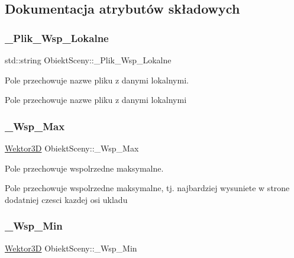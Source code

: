 \subsection{Dokumentacja atrybutów składowych}
\mbox{\label{classObiektSceny_abd56bb7b6b0db7ecef8055ce16131358}} 
\subsubsection{\texorpdfstring{\+\_\+\+Plik\+\_\+\+Wsp\+\_\+\+Lokalne}{\_Plik\_Wsp\_Lokalne}}
{\footnotesize\ttfamily std\+::string Obiekt\+Sceny\+::\+\_\+\+Plik\+\_\+\+Wsp\+\_\+\+Lokalne\hspace{0.3cm}{\ttfamily [private]}}



Pole przechowuje nazwe pliku z danymi lokalnymi. 

Pole przechowuje nazwe pliku z danymi lokalnymi \mbox{\label{classObiektSceny_a09bfe62996fd73bbc7876524b211ce20}} 
\subsubsection{\texorpdfstring{\+\_\+\+Wsp\+\_\+\+Max}{\_Wsp\_Max}}
{\footnotesize\ttfamily \hyperlink{classSWektor}{Wektor3D} Obiekt\+Sceny\+::\+\_\+\+Wsp\+\_\+\+Max\hspace{0.3cm}{\ttfamily [private]}}



Pole przechowuje wspolrzedne maksymalne. 

Pole przechowuje wspolrzedne maksymalne, tj. najbardziej wysuniete w strone dodatniej czesci kazdej osi ukladu \mbox{\label{classObiektSceny_a7395dc947479c40e29636cd8e8c5bfd3}} 
\subsubsection{\texorpdfstring{\+\_\+\+Wsp\+\_\+\+Min}{\_Wsp\_Min}}
{\footnotesize\ttfamily \hyperlink{classSWektor}{Wektor3D} Obiekt\+Sceny\+::\+\_\+\+Wsp\+\_\+\+Min\hspace{0.3cm}{\ttfamily [private]}}



